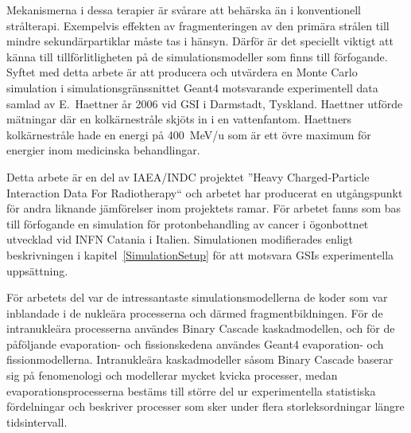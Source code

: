 Mekanismerna i dessa terapier är svårare att behärska än i konventionell strålterapi. Exempelvis effekten av fragmenteringen av den primära strålen till mindre sekundärpartiklar måste tas i hänsyn. Därför är det speciellt viktigt att känna till tillförlitligheten på de simulationsmodeller som finns till förfogande. Syftet med detta arbete är att producera och utvärdera en Monte Carlo simulation i simulationsgränssnittet Geant4 motsvarande experimentell data samlad av E.~Haettner år 2006 vid GSI i Darmstadt, Tyskland. Haettner utförde mätningar där en kolkärnestråle skjöts in i en vattenfantom. Haettners kolkärnestråle hade en energi på 400~MeV/u som är ett övre maximum för energier inom medicinska behandlingar.

Detta arbete är en del av IAEA/INDC projektet ''Heavy Charged-Particle Interaction Data For Radiotherapy`` och arbetet har producerat en utgångspunkt för andra liknande jämförelser inom projektets ramar. För arbetet fanns som bas till förfogande en simulation för protonbehandling av cancer i ögonbottnet utvecklad vid INFN Catania i Italien. Simulationen modifierades enligt beskrivningen i kapitel~\ref{SimulationSetup} för att motsvara GSIs experimentella uppsättning.

För arbetets del var de intressantaste simulationsmodellerna de koder som var inblandade i de nukleära processerna och därmed fragmentbildningen. För de intranukleära processerna användes Binary Cascade kaskadmodellen, och för de påföljande evaporation- och fissionskedena användes Geant4 evaporation- och fissionmodellerna. Intranukleära kaskadmodeller såsom Binary Cascade baserar sig på fenomenologi och modellerar mycket kvicka processer, medan evaporationsprocesserna bestäms till större del ur experimentella statistiska fördelningar och beskriver processer som sker under flera storleksordningar längre tidsintervall.


